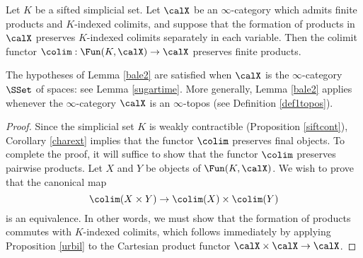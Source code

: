 \begin{lemma}\label{bale2}
Let $K$ be a sifted simplicial set. Let $\calX$ be an $\infty$-category which admits finite products and
$K$-indexed colimits, and suppose that the formation of products in $\calX$ preserves $K$-indexed colimits separately in each variable. Then the colimit functor $\colim: \Fun(K, \calX) \rightarrow \calX$
preserves finite products.
\end{lemma}

\begin{remark}\label{bale3}
The hypotheses of Lemma \ref{bale2} are satisfied when $\calX$ is the $\infty$-category $\SSet$ of spaces: see Lemma \ref{sugartime}. More generally, Lemma \ref{bale2} applies whenever
the $\infty$-category $\calX$ is an $\infty$-topos (see Definition \ref{def1topos}).
\end{remark}

\begin{proof}
Since the simplicial set $K$ is weakly contractible (Proposition \ref{siftcont}), Corollary \ref{charext} implies that the functor $\colim$ preserves final objects. To complete the proof, it will suffice to show that the functor $\colim$ preserves pairwise products. Let $X$ and $Y$ be objects of $\Fun(K, \calX)$. We wish to prove that the canonical map
$$ \colim( X \times Y) \rightarrow \colim(X) \times \colim(Y)$$ is an equivalence.
In other words, we must show that the formation of products commutes with $K$-indexed colimits, which follows immediately by applying Proposition \ref{urbil} to the Cartesian product functor
$\calX \times \calX \rightarrow \calX$.
\end{proof}

